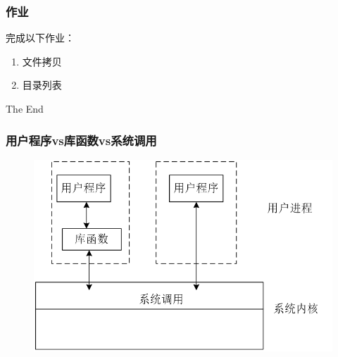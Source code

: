 \documentclass{beamer}
\begin{document}
\begin{frame}
\frametitle{作业}
完成以下作业：
\begin{enumerate}
\item
文件拷贝
\item
目录列表
\end{enumerate}
\end{frame}



\begin{frame}
\Huge{\centerline{The End}}
\end{frame}

\begin{frame}

\frametitle{用户程序vs库函数vs系统调用}

\begin{figure}
\includegraphics[width=1\linewidth]{601}
\end{figure}
\end{frame}
\end{document}
